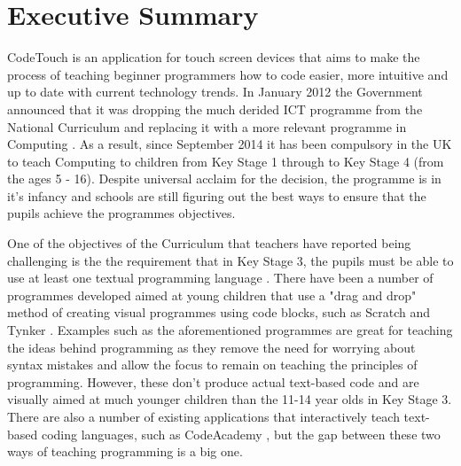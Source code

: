 \documentclass[ %
                    author={Jonathan Rankin},
                supervisor={Dr. David May, Dr. Ian Holyer},
                    degree={MEng},
                     title={CodeTouch},
                  subtitle={A Revolutionary Way To Program Real Code On Touch Screen Devices},
                      type={enterprise},
                      year={2015 } ]{dissertation}
\begin{document}
\frontmatter


\makedecl


\tableofcontents
\listoffigures
\listoftables
\listofalgorithms
\lstlistoflistings



\chapter*{Executive Summary}


\noindent
CodeTouch is an application for touch screen devices that aims to make the process of teaching beginner programmers 
how to code easier, more intuitive and up to date with current technology trends. In January 2012 the Government
announced that it was dropping the much derided ICT programme from the National Curriculum and replacing it with 
a more relevant programme in Computing \cite{BBCITCstory}. As a result, since September 2014 it has been compulsory 
in the UK to teach Computing to children from Key Stage 1 through to Key Stage 4 (from the ages 5 - 16). Despite universal
acclaim for the decision, the programme is in it's infancy and schools are still figuring out the best ways to ensure that the pupils achieve the programmes objectives.

One of the objectives of the Curriculum that teachers have reported being challenging is the the requirement that in Key Stage 3, the pupils must be able to use at least one textual programming language \cite{KS3}. There have been a number of programmes developed aimed at young children that use a "drag and drop" method of creating visual programmes using code blocks, such as Scratch \cite{Scratch} and Tynker \cite{Tynker}. Examples such as the aforementioned programmes are great for teaching the ideas behind programming as they remove the need for worrying about syntax mistakes and allow the focus to remain on teaching the principles of programming. However, these don't produce actual text-based code and are visually aimed at much younger children than the 11-14 year olds in Key Stage 3. There are also a number of existing applications that interactively teach text-based coding languages, such as CodeAcademy \cite{CodeAcademy}, but the gap between these two ways of teaching programming is a big one.
\end{document}
